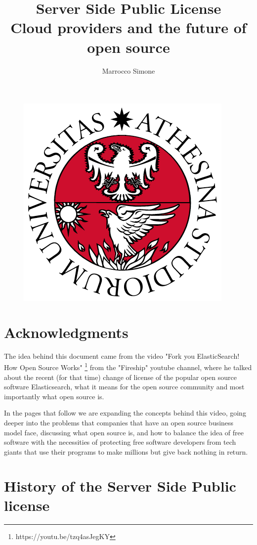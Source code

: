 \documentclass[12pt, a4paper]{article}
\title{%
  Server Side Public License \\
  \large Cloud providers and the future of open source
}
\author{Marrocco Simone}
\begin{document}
  \maketitle
  \begin{figure}[H]
    \centering
    \includegraphics[scale=0.35]{unitn.png}
  \end{figure}
  \tableofcontents

  \section{Acknowledgments}
  The idea behind this document came from the video "Fork you ElasticSearch! How Open Source Works" \footnote{https://youtu.be/tzq4asJegKY} from the "Fireship" youtube channel, where he talked about the recent (for that time) change of license of the popular open source software Elasticsearch, what it means for the open source community and most importantly what open source is. 

  In the pages that follow we are expanding the concepts behind this video, going deeper into the problems that companies that have an open source business model face, discussing what open source is, and how to balance the idea of free software with the necessities of protecting free software developers from tech giants that use their programs to make millions but give back nothing in return.

  \pagebreak
  \section{History of the Server Side Public license}
\end{document}
